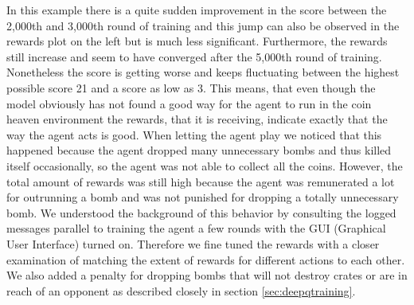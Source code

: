 In this example there is a quite sudden improvement in the score between the 2,000th and 3,000th round of training and this jump can also be observed in the rewards plot on the left but is much less significant. Furthermore, the rewards still increase and seem to have converged after the 5,000th round of training. Nonetheless the score is getting worse and keeps fluctuating between the highest possible score 21 and a score as low as 3. This means, that even though the model obviously has not found a good way for the agent to run in the coin heaven environment the rewards, that it is receiving, indicate exactly that the way the agent acts is good. When letting the agent play we noticed that this happened because the agent dropped many unnecessary bombs and thus killed itself occasionally, so the agent was not able to collect all the coins. However, the total amount of rewards was still high because the agent was remunerated a lot for outrunning a bomb and was not punished for dropping a totally unnecessary bomb. We understood the background of this behavior by consulting the logged messages parallel to training the agent a few rounds with the GUI (Graphical User Interface) turned on. Therefore we fine tuned the rewards with a closer examination of matching the extent of rewards for different actions to each other. We also added a penalty for dropping bombs that will not destroy crates or are in reach of an opponent as described closely in section \ref{sec:deepqtraining}. \\

